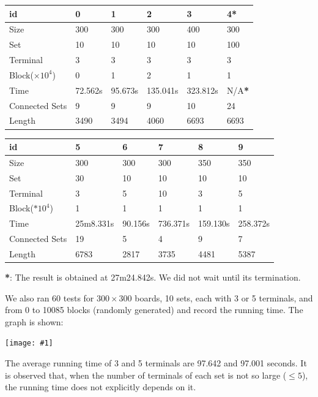 \documentclass[12pt, a4paper]{article}
\newcommand{\fullimage}[1]{
	\begin{flushleft}
		\texttt{[image: \#1]}
	\end{flushleft}
}
\begin{document}
\begin{flushleft}
			\begin{tabular}{l l l l l l}
			\textbf{id} & \textbf{0} & \textbf{1} & \textbf{2} & \textbf{3} & \textbf{4*} \\
			\midrule
			Size & 300 & 300 & 300 & 400 & 300 \\
			Set & 10 & 10 & 10 & 10 & 100 \\
			Terminal & 3 & 3 & 3 & 3 & 3 \\
			Block($\times 10^4$) & 0 & 1 & 2 & 1 & 1 \\
			Time  & 72.562s & 95.673s & 135.041s & 323.812s & N/A\textbf{*} \\
			Connected Sets & 9 & 9 & 9 & 10 & 24 \\
			Length & 3490 & 3494 & 4060 & 6693 & 6693 \\
			\bottomrule
			\end{tabular}

			\begin{tabular}{l l l l l l}
			\textbf{id} & \textbf{5} & \textbf{6} & \textbf{7} & \textbf{8} & \textbf{9}\\
			\midrule
			Size & 300 & 300 & 300 & 350 & 350 \\
			Set & 30 & 10 & 10 & 10 & 10 \\
			Terminal & 3 & 5 & 10 & 3 & 5 \\
			Block($*10^4$) & 1 & 1 & 1 & 1 & 1 \\
			Time  & 25m8.331s & 90.156s & 736.371s & 159.130s & 258.372s  \\
			Connected Sets & 19 & 5 & 4 & 9 & 7  \\
			Length & 6783 & 2817 & 3735 & 4481 & 5387  \\
			\bottomrule
			\end{tabular}
\end{flushleft}

	\textbf{*}: The result is obtained at 27m24.842s. We did not wait until its termination.

	We also ran 60 tests for $300 \times 300$ boards, 10 sets, each with 3 or 5 terminals, and from 0 to 10085 blocks (randomly generated) and record the running time. The graph is shown:

	\fullimage{statistics.png}
	
	The average running time of 3 and 5 terminals are 97.642 and 97.001 seconds. It is observed that, when the number of terminals of each set is not so large ($\leq 5$), the running time does not explicitly depends on it.
	
\end{document}
